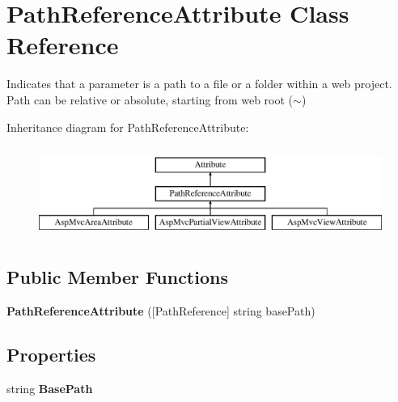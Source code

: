 \hypertarget{class_path_reference_attribute}{}\section{Path\+Reference\+Attribute Class Reference}
\label{class_path_reference_attribute}


Indicates that a parameter is a path to a file or a folder within a web project. Path can be relative or absolute, starting from web root ($\sim$)  


Inheritance diagram for Path\+Reference\+Attribute\+:\begin{figure}[H]
\begin{center}
\leavevmode
\includegraphics[height=3.000000cm]{class_path_reference_attribute}
\end{center}
\end{figure}
\subsection*{Public Member Functions}
\begin{DoxyCompactItemize}
\item 
\hypertarget{class_path_reference_attribute_a68daaaec94376b8e988ddcfd72229030}{}{\bfseries Path\+Reference\+Attribute} (\mbox{[}Path\+Reference\mbox{]} string base\+Path)\label{class_path_reference_attribute_a68daaaec94376b8e988ddcfd72229030}

\end{DoxyCompactItemize}
\subsection*{Properties}
\begin{DoxyCompactItemize}
\item 
\hypertarget{class_path_reference_attribute_ae6cf5aa92a7198b24c0656f974c3738d}{}string {\bfseries Base\+Path}\label{class_path_reference_attribute_ae6cf5aa92a7198b24c0656f974c3738d}

\end{DoxyCompactItemize}


